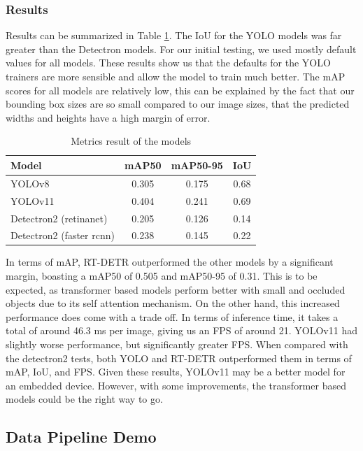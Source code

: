 \documentclass[stu,12pt,floatsintext]{apa7}
\begin{document}
\subsubsection{Results}
Results can be summarized in Table \ref{tab:results}. The IoU for the YOLO models was far greater than the Detectron models. For our initial testing, we used mostly default values for all models. These results show us that the defaults for the YOLO trainers are more sensible and allow the model to train much better. The mAP scores for all models are relatively low, this can be explained by the fact that our bounding box sizes are so small compared to our image sizes, that the predicted widths and heights have a high margin of error.

\begin{table}[H]
	\centering
	\begin{tabular}{lccc}
		\hline
		Model                    & mAP50 & mAP50-95 & IoU  \\
		\hline
		YOLOv8                   & 0.305 & 0.175    & 0.68 \\
		YOLOv11                  & 0.404 & 0.241    & 0.69 \\
		Detectron2 (retinanet)   & 0.205 & 0.126    & 0.14 \\
		Detectron2 (faster rcnn) & 0.238 & 0.145    & 0.22 \\
		\hline
	\end{tabular}
	\caption{Metrics result of the models}
	\label{tab:results}
\end{table}

In terms of mAP, RT-DETR outperformed the other models by a significant margin, boasting a mAP50 of 0.505 and mAP50-95 of 0.31. This is to be expected, as transformer based models perform better with small and occluded objects due to its self attention mechanism. On the other hand, this increased performance does come with a trade off. In terms of inference time, it takes a total of around 46.3 ms per image, giving us an FPS of around 21. YOLOv11 had slightly worse performance, but significantly greater FPS. When compared with the detectron2 tests, both YOLO and RT-DETR outperformed them in terms of mAP, IoU, and FPS. Given these results, YOLOv11 may be a better model for an embedded device. However, with some improvements, the transformer based models could be the right way to go. 

\subsection{Data Pipeline Demo}
\end{document}
